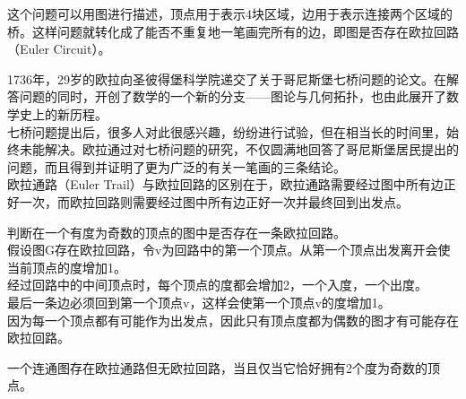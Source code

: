 这个问题可以用图进行描述，顶点用于表示4块区域，边用于表示连接两个区域的桥。这样问题就转化成了能否不重复地一笔画完所有的边，即图是否存在欧拉回路（Euler Circuit）。

\begin{figure}[H]
	\centering
\end{figure}

1736年，29岁的欧拉向圣彼得堡科学院递交了关于哥尼斯堡七桥问题的论文。在解答问题的同时，开创了数学的一个新的分支——图论与几何拓扑，也由此展开了数学史上的新历程。\\

七桥问题提出后，很多人对此很感兴趣，纷纷进行试验，但在相当长的时间里，始终未能解决。欧拉通过对七桥问题的研究，不仅圆满地回答了哥尼斯堡居民提出的问题，而且得到并证明了更为广泛的有关一笔画的三条结论。\\

欧拉通路（Euler Trail）与欧拉回路的区别在于，欧拉通路需要经过图中所有边正好一次，而欧拉回路则需要经过图中所有边正好一次并最终回到出发点。

\begin{tcolorbox}
	判断在一个有度为奇数的顶点的图中是否存在一条欧拉回路。\\
	假设图G存在欧拉回路，令v为回路中的第一个顶点。从第一个顶点出发离开会使当前顶点的度增加1。\\
	经过回路中的中间顶点时，每个顶点的度都会增加2，一个入度，一个出度。\\
	最后一条边必须回到第一个顶点v，这样会使第一个顶点v的度增加1。\\
	因为每一个顶点都有可能作为出发点，因此只有顶点度都为偶数的图才有可能存在欧拉回路。
\end{tcolorbox}

一个连通图存在欧拉通路但无欧拉回路，当且仅当它恰好拥有2个度为奇数的顶点。

